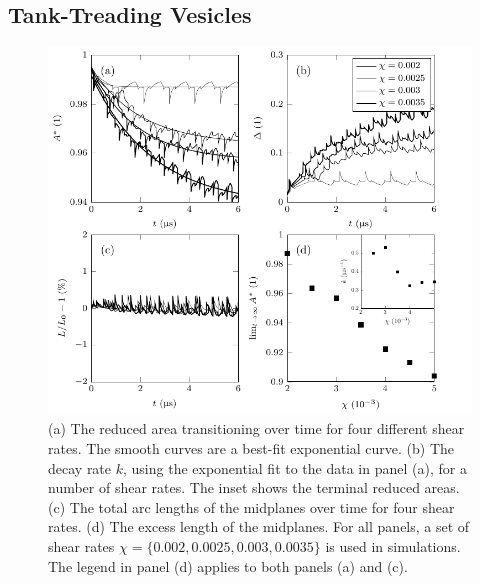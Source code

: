 \documentclass[lineno]{jfm}
\begin{document}
\subsection{Tank-Treading Vesicles}
\begin{figure}
\begin{center}
\includegraphics[width=13.5cm]{Figure4_Wrapper.pdf}
\end{center} 
  \caption{\label{figure4} (a) The reduced area transitioning over time
  for four different shear rates. The smooth curves are a best-fit
  exponential curve. (b) The decay rate $k$, using the exponential fit
  to the data in panel (a), for a number of shear rates. The inset shows
  the terminal reduced areas. (c) The total arc lengths of the midplanes
  over time for four shear rates. (d) The excess length of the
  midplanes. For all panels, a set of shear rates
  $\chi=\{0.002,0.0025,0.003,0.0035\}$ is used in simulations. The
  legend in panel (d) applies to both panels (a) and (c).}
\end{figure}
\end{document}

